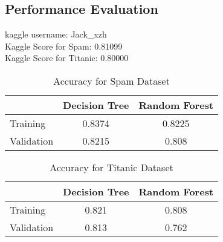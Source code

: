 \documentclass[a4paper,12pt]{article}
\begin{document}
\subsection{Performance Evaluation}
kaggle username: Jack\_xzh  \\
Kaggle Score for Spam: 0.81099 \\
Kaggle Score for Titanic: 0.80000 \\
\begin{table}[htbp]
  \centering
  \caption{Accuracy for Spam Dataset}
    \begin{tabular}{l|cc}
      & \multicolumn{1}{l}{Decision Tree} & \multicolumn{1}{l}{Random Forest} \\
      \hline
    Training  & 0.8374 & 0.8225 \\
    Validation & 0.8215 & 0.808 \\
    \end{tabular}%
\end{table}%

\begin{table}[htbp]
  \centering
  \caption{Accuracy for Titanic Dataset}
    \begin{tabular}{l|cc}
      & \multicolumn{1}{l}{Decision Tree} & \multicolumn{1}{l}{Random Forest} \\
      \hline
    Training  & 0.821 & 0.808 \\
    Validation & 0.813 & 0.762 \\
    \end{tabular}%
  \label{tab:addlabel}%
\end{table}%

\clearpage
\end{document}
